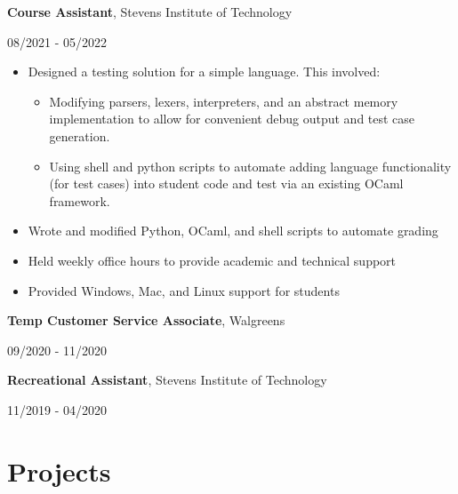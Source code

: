 \documentclass[10pt,letterpaper]{article}
\begin{document}
  \textbf{Course Assistant}, Stevens Institute of Technology\hfill
	\begin{minipage}[t]{1.2in}
		08/2021 - 05/2022
	\end{minipage}
	\begin{itemize}
		\item Designed a testing solution for a simple language. This involved:
      \begin{itemize}
        \item Modifying parsers, lexers, interpreters, and an abstract memory implementation to allow for convenient debug output and test case generation.
        \item Using shell and python scripts to automate adding language functionality (for test cases) into student code and test via an existing OCaml framework.
      \end{itemize}
    \item Wrote and modified Python, OCaml, and shell scripts to automate grading
    \item Held weekly office hours to provide academic and technical support
    \item Provided Windows, Mac, and Linux support for students
	\end{itemize}

    \textbf{Temp Customer Service Associate}, Walgreens \hfill
    \begin{minipage}[t]{1.2in}
      09/2020 - 11/2020
    \end{minipage}

    \textbf{Recreational Assistant}, Stevens Institute of Technology\hfill
    \begin{minipage}[t]{1.2in}
      11/2019 - 04/2020
    \end{minipage}

  \section{Projects}
\end{document}
